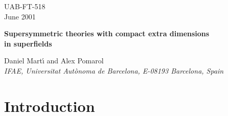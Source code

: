 \documentclass[a4paper,12pt]{article}
\begin{document}
\topmargin -1.0cm
\oddsidemargin -0.8cm
\evensidemargin -0.8cm
\pagestyle{empty}
\begin{flushright}
UAB-FT-518\\
June 2001
\end{flushright}
\vspace*{5mm}

\begin{center}


{\Large\bf 
Supersymmetric theories with compact extra dimensions}\\ 
\vspace*{5mm}
{\Large\bf 
in \coordHE{}   superfields}\\
\vspace{2.0cm}



{\large Daniel Mart{\'\i} and  Alex Pomarol}\\

\vspace{.6cm}
{\it IFAE, Universitat Aut{\`o}noma de Barcelona, 
E-08193 Barcelona, Spain}
\vspace{.4cm}
\end{center}

\vspace{1cm}
\begin{abstract}
We present an \coordHE{} superfield formulation 
of   supersymmetric gauge theories 
with a compact  extra dimension. 
The formulation 
incorporates
the radion superfield and allows to
write
supersymmetric theories
on warped gravitational backgrounds.
We apply it to study the breaking of supersymmetry
by the \coordHE{}-term of the radion, and show that,
for  flat extra dimensions,
this leads to 
the same mass spectrum as 
in  Scherk-Schwarz  models of supersymmetry breaking.
We also consider scenarios where supersymmetry
is broken on a boundary of a warped extra dimension
and compare them with anomaly mediated models.
\end{abstract}

\vfill
\begin{flushleft}
\end{flushleft}
\eject
\pagestyle{empty}
\setcounter{page}{1}
\setcounter{footnote}{0}
\pagestyle{plain}



\section{Introduction}
\end{document}
